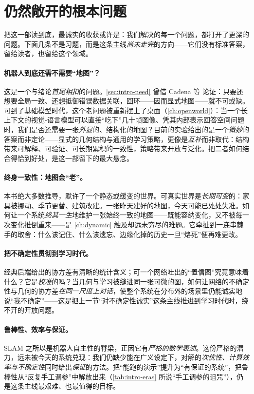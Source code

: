 \section{仍然敞开的根本问题}
\label{sec:epilogue-open}

把这一部读到底，最诚实的收获或许是：我们解决的每一个问题，都打开了更深的问题。下面几条不是习题，而是这条主线\emph{尚未走完}的方向——它们没有标准答案，留给读者，也留给这个领域。

\paragraph{机器人到底还需不需要“地图”？}
这是一个与绪论\emph{首尾相扣}的问题。\cref{sec:intro-need} 曾借 Cadena 等\cite{cadena2016past} 论证：只要还想要全局一致、还想抵御错误数据关联，回环——因而显式地图——就不可或缺。可到了基础模型时代，这个老问题被重新摆上了桌面（\cref{ch:openworld}）：当一个长上下文的视觉-语言模型可以直接“吃下”几十帧图像、凭其内部表示回答空间问题时，我们是否还需要一张\emph{外显}的、结构化的地图？目前的实验给出的是一个\emph{微妙}的答案而非定论——显式的几何结构与通用的学习策略，更像是\emph{互补}而非取代：结构带来可解释、可验证、可长期累积的一致性，策略带来开放与泛化。把二者如何结合得恰到好处，是这一部留下的最大悬念。

\paragraph{终身一致性：地图会“老”。}
本书绝大多数推导，默许了一个静态或缓变的世界。可真实世界是\emph{长期可变}的：家具被挪动、季节更替、建筑改建。一张昨天建好的地图，今天可能已处处失准。如何让一个系统\emph{终其一生}地维护一张始终一致的地图——既能容纳变化，又不被每一次变化推倒重来——是 \cref{ch:dynamic} 触及却远未穷尽的难题。它牵扯到一连串棘手的取舍：什么该记住、什么该遗忘、边缘化掉的历史一旦“烙死”便再难更改。

\paragraph{把不确定性贯彻到学习时代。}
经典后端给出的协方差有清晰的统计含义；可一个网络吐出的“置信图”究竟意味着什么？它是\emph{校准}的吗？当几何与学习被缝进同一张可微的图，如何让网络的不确定性与几何的协方差\emph{在同一尺度上对话}，使整个系统在分布外的场景里仍能诚实地说“我不确定”——这是把上一节“对不确定性诚实”这条主线推进到学习时代时，绕不开的开放问题。

\paragraph{鲁棒性、效率与保证。}
SLAM 之所以是机器人自主性的脊梁，正因它有\emph{严格的数学表述}。这份严格的潜力，远未被今天的系统兑现：我们仍缺少能在广义设定下，对解的\emph{次优性、计算效率与不确定性}同时给出\emph{保证}的方法。把“能跑的演示”提升为“有保证的系统”，把鲁棒性从“反复手工调参”中解放出来（\cref{tab:intro-eras} 所说“手工调参的诅咒”），仍是这条主线最艰难、也最值得的目标。

